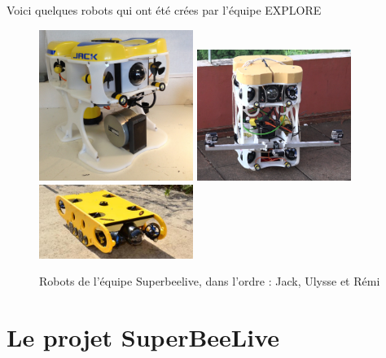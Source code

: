 \documentclass[11pt,french,a4paper]{report}
\begin{document}
Voici quelques robots qui ont été crées par l'équipe EXPLORE

\begin{figure}[!h]
    \centering 
    \includegraphics[width=5cm]{./img/robot_jack.jpg}
    \includegraphics[width=5cm]{./img/robot_ulysse.png}
    \includegraphics[width=5cm]{./img/robot.jpg}
    \caption{Robots de l'équipe Superbeelive, dans l'ordre : Jack, Ulysse et Rémi}
    \label{orga_sbl}

\end{figure}
\clearpage

\section{Le projet SuperBeeLive}
\end{document}

